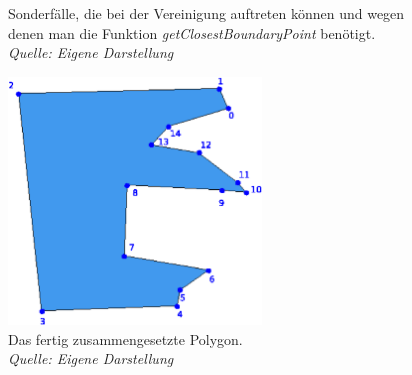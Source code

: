\begin{figure}
\hfill
{}
\caption[Sonderfälle die bei der Vereinigung auftreten können]{Sonderfälle, die bei der Vereinigung auftreten können und wegen denen man die Funktion \textit{getClosestBoundaryPoint} benötigt.\\\textit{Quelle: Eigene Darstellung}}
\label{fig:SonderfaelleJLL}
\end{figure}



\begin{figure}
	\centering
	\includegraphics[width=0.6\textwidth]{JLL3.svg.eps}
	\caption[Fertig zusammengesetztes Polygon]{Das fertig zusammengesetzte Polygon.\\\textit{Quelle: Eigene Darstellung}}
	\label{fig:JLL3}
\end{figure}


